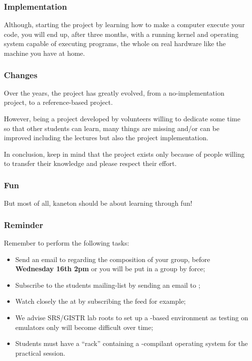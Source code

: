 
\begin{frame}
  \frametitle{Implementation}

  Although, starting the project by learning how to make a computer execute
  your code, you will end up, after three months, with a running kernel
  and operating system capable of executing programs, the whole on real
  hardware like the machine you have at home.
\end{frame}


\begin{frame}
  \frametitle{Changes}

  Over the years, the project has greatly evolved, from a no-implementation
  project, to a reference-based project.

  \-

  However, being a project developed by volunteers willing to dedicate some
  time so that other students can learn, many things are missing and/or
  can be improved including the lectures but also the project implementation.

  \-

  In conclusion, keep in mind that the project exists only because of people
  willing to transfer their knowledge and please respect their effort.
\end{frame}


\begin{frame}
  \frametitle{Fun}

  But most of all, kaneton should be about learning through fun!
\end{frame}


\begin{frame}
  \frametitle{Reminder}

  Remember to perform the following tasks:

  \begin{itemize}
    \item
      Send an email to  regarding the composition
      of your group, before \textbf{Wednesday 16th 2pm} or you will be put
      in a group by force;
    \item
      Subscribe to the students mailing-list
       by sending an email to
      ;
    \item
      Watch closely the  at  by
      subscribing the  feed for example;
    \item
      We advise SRS/GISTR lab roots to set up a -based environment
      as testing on emulators only will become difficult over time;
    \item
      Students must have a ``rack'' containing a -compilant
      operating system for the  practical session.
  \end{itemize}
\end{frame}


